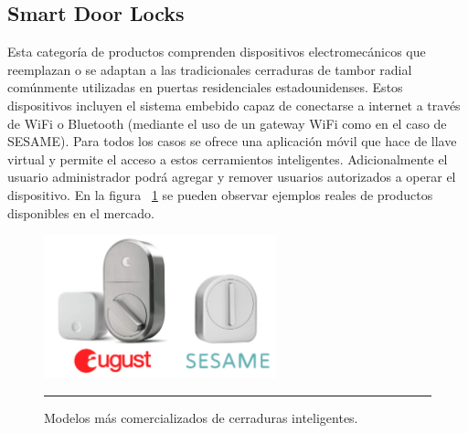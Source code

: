 \subsection{Smart Door Locks}
Esta categoría de productos comprenden dispositivos electromecánicos que reemplazan o se adaptan a las tradicionales cerraduras de tambor radial comúnmente utilizadas en puertas residenciales estadounidenses.
Estos dispositivos incluyen el sistema embebido capaz de conectarse a internet a través de WiFi o Bluetooth (mediante el uso de un gateway WiFi como en el caso de SESAME).
Para todos los casos se ofrece una aplicación móvil que hace de llave virtual y permite el acceso a estos cerramientos inteligentes.
Adicionalmente el usuario administrador podrá agregar y remover usuarios autorizados a operar el dispositivo.
En la figura ~\ref{fig:smartlocks} se pueden observar ejemplos reales de productos disponibles en el mercado.

\begin{figure}[htbp]
	\centering
	\includegraphics[width=0.6\textwidth]{Pictures/smartlocks.png}
	\rule{35em}{1pt}
	\caption[Smart Locks]{Modelos más comercializados de cerraduras inteligentes.}
	\label{fig:smartlocks}
\end{figure}

